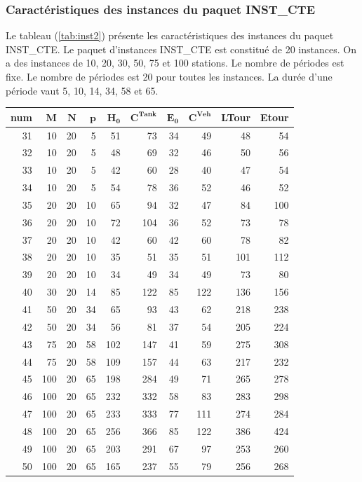 {\subsubsection{Caractéristiques des instances du paquet INST\_CTE}
Le tableau (\ref{tab:inst2}) présente les caractéristiques des instances du paquet INST\_CTE.
Le paquet d'instances INST\_CTE est constitué de 20 instances. On a des instances de 10, 20, 30, 50, 75 et 100 stations. Le nombre de périodes est fixe. Le nombre de périodes est 20 pour toutes les instances. La durée d'une période vaut 5, 10, 14, 34, 58 et 65.  
\begin{table}[H]
	\centering
	\small{
		\begin{tabular}{|r|r|r|r|r|r|r|r|r|r|}
			\hline
			\toprule
			\rowcolor{cyan}	\textbf{num} &$\mathbf{M}$ & $\mathbf{N}$ & $\mathbf{p}$ &  $\mathbf{H_0} $ & $\mathbf{C^{Tank}}$ & $\mathbf{E_0}$ & $\mathbf{C^{Veh}}$ & \textbf{LTour} & \textbf{Etour} \\
			\midrule
			\hline
			31	&	10	&	20	&	5	&	51	&	73	&	34	&	49	&	48	&	54	\\ \hline
			32	&	10	&	20	&	5	&	48	&	69	&	32	&	46	&	50	&	56	\\ \hline
			33	&	10	&	20	&	5	&	42	&	60	&	28	&	40	&	47	&	54	\\ \hline
			34	&	10	&	20	&	5	&	54	&	78	&	36	&	52	&	46	&	52	\\ \hline
			35	&	20	&	20	&	10	&	65	&	94	&	32	&	47	&	84	&	100	\\ \hline
			36	&	20	&	20	&	10	&	72	&	104	&	36	&	52	&	73	&	78	\\ \hline
			37	&	20	&	20	&	10	&	42	&	60	&	42	&	60	&	78	&	82	\\ \hline
			38	&	20	&	20	&	10	&	35	&	51	&	35	&	51	&	101	&	112	\\ \hline
			39	&	20	&	20	&	10	&	34	&	49	&	34	&	49	&	73	&	80	\\ \hline
			40	&	30	&	20	&	14	&	85	&	122	&	85	&	122	&	136	&	156	\\ \hline
			41	&	50	&	20	&	34	&	65	&	93	&	43	&	62	&	218	&	238	\\ \hline
			42	&	50	&	20	&	34	&	56	&	81	&	37	&	54	&	205	&	224	\\ \hline
			43	&	75	&	20	&	58	&	102	&	147	&	41	&	59	&	275	&	308	\\ \hline
			44	&	75	&	20	&	58	&	109	&	157	&	44	&	63	&	217	&	232	\\ \hline
			45	&	100	&	20	&	65	&	198	&	284	&	49	&	71	&	265	&	278	\\ \hline
			46	&	100	&	20	&	65	&	232	&	332	&	58	&	83	&	283	&	298	\\ \hline
			47	&	100	&	20	&	65	&	233	&	333	&	77	&	111	&	274	&	284	\\ \hline
			48	&	100	&	20	&	65	&	256	&	366	&	85	&	122	&	386	&	424	\\ \hline
			49	&	100	&	20	&	65	&	203	&	291	&	67	&	97	&	253	&	260	\\ \hline
			50	&	100	&	20	&	65	&	165	&	237	&	55	&	79	&	256	&	268	\\ \hline
			

\end{tabular}}
\end{table}}
